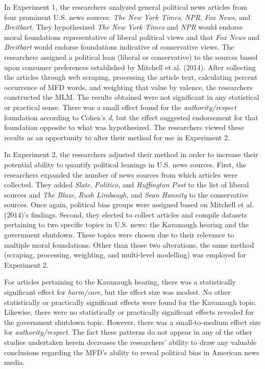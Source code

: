 \documentclass[english,,man]{apa6}
\begin{document}
In Experiment 1, the researchers analyzed general political news
articles from four prominent U.S. news sources: \emph{The New York
Times}, \emph{NPR}, \emph{Fox News}, and \emph{Breitbart}. They
hypothesized \emph{The New York Times} and \emph{NPR} would endorse
moral foundations representative of liberal political views and that
\emph{Fox News} and \emph{Breitbart} would endorse foundations
indicative of conservative views. The researchers assigned a political
lean (liberal or conservative) to the sources based upon consumer
preferences established by Mitchell et al. (2014). After collecting the
articles through web scraping, processing the article text, calculating
percent occurrence of MFD words, and weighting that value by valence,
the researchers constructed the MLM. The results obtained were not
significant in any statistical or practical sense. There was a small
effect found for the \emph{authority/respect} foundation according to
Cohen's \emph{d}, but the effect suggested endorsement for that
foundation opposite to what was hypothesized. The researchers viewed
these results as an opportunity to alter their method for use in
Experiment 2.

In Experiment 2, the researchers adjusted their method in order to
increase their potential ability to quantify political leanings in U.S.
news sources. First, the researchers expanded the number of news sources
from which articles were collected. They added \emph{Slate},
\emph{Politico}, and \emph{Huffington Post} to the list of liberal
sources and \emph{The Blaze}, \emph{Rush Limbaugh}, and \emph{Sean
Hannity} to the conservative sources. Once again, political bias groups
were assigned based on Mitchell et al. (2014)'s findings. Second, they
elected to collect articles and compile datasets pertaining to two
specific topics in U.S. news: the Kavanaugh hearing and the government
shutdown. These topics were chosen due to their relevance to multiple
moral foundations. Other than those two alterations, the same method
(scraping, processing, weighting, and multi-level modelling) was
employed for Experiment 2.

For articles pertaining to the Kavanaugh hearing, there was a
statistically significant effect for \emph{harm/care}, but the effect
size was modest. No other statistically or practically significant
effects were found for the Kavanaugh topic. Likewise, there were no
statistically or practically significant effects revealed for the
government shutdown topic. However, there was a small-to-medium effect
size for \emph{authority/respect}. The fact these patterns do not appear
in any of the other studies undertaken herein decreases the researchers'
ability to draw any valuable conclusions regarding the MFD's ability to
reveal political bias in American news media.
\end{document}
